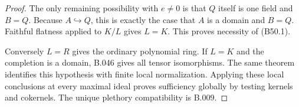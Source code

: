 \begin{proof}
The only remaining possibility with $e\ne0$ is
that $Q$ itself is one field and $B=Q$.
Because $A\hookrightarrow Q$, this is exactly
the case that $A$ is a domain and $B=Q$.
Faithful flatness applied to $K/L$ gives $L=K$.
This proves necessity of (B50.1).

Conversely $L=R$ gives the ordinary polynomial ring.
If $L=K$ and the completion is a domain, B.046
gives all tensor isomorphisms. The same theorem
identifies this hypothesis with finite local
normalization. Applying these local conclusions
at every maximal ideal proves sufficiency globally
by testing kernels and cokernels. The unique
plethory compatibility is B.009.
\end{proof}
